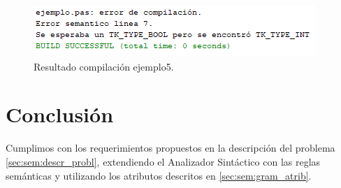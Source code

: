 \begin{figure}[H]
\centering
\includegraphics[]{img/semantico/semantico_ej5.png}
\caption{Resultado compilación ejemplo5.}
\label{fig:semantico_ej5}
\end{figure}



\section{Conclusión}
Cumplimos con los requerimientos propuestos en la descripción del problema \ref{sec:sem:descr_probl}, extendiendo el Analizador Sintáctico con las reglas semánticas y utilizando los atributos descritos en \ref{sec:sem:gram_atrib}. 
